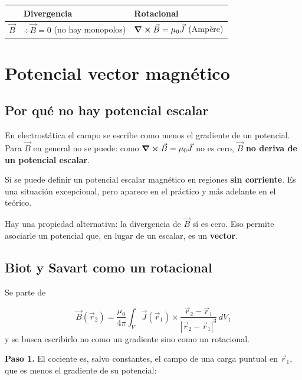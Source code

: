\documentclass[12pt,a4paper]{article}
\begin{document}
\begin{center}
\renewcommand{\arraystretch}{1.35}
\small
\begin{tabularx}{\textwidth}{l>{\raggedright\arraybackslash}X>{\raggedright\arraybackslash}X}
\toprule
 & \textbf{Divergencia} & \textbf{Rotacional} \\
\midrule
$\vec B$ & $\div \vec B = 0$ (no hay monopolos) & $\curl \vec B = \mu_0\vec J$ (Ampère) \\
\bottomrule
\end{tabularx}
\end{center}

\section{Potencial vector magnético}

\subsection{Por qué no hay potencial escalar}

En electrostática el campo se escribe como menos el gradiente de un potencial.
Para $\vec B$ en general no se puede: como $\curl \vec B = \mu_0\vec J$
no es cero, $\vec B$ \textbf{no deriva de un potencial escalar}.

\begin{notebox}
Sí se puede definir un potencial escalar magnético en regiones \textbf{sin
corriente}. Es una situación excepcional, pero aparece en el práctico y más
adelante en el teórico.
\end{notebox}

Hay una propiedad alternativa: la divergencia de $\vec B$ sí es cero. Eso
permite asociarle un potencial que, en lugar de un escalar, es un \textbf{vector}.

\subsection{Biot y Savart como un rotacional}

Se parte de

\[
\vec B(\vec r_2) = \frac{\mu_0}{4\pi}\int_V
\vec J(\vec r_1)\times\frac{\vec r_2-\vec r_1}{|\vec r_2-\vec r_1|^3}\,dV_1
\]
y se busca escribirlo no como un gradiente sino como un rotacional.

\textbf{Paso 1.} El cociente es, salvo constantes, el campo de una carga puntual en
$\vec r_1$, que es menos el gradiente de su potencial:
\end{document}
